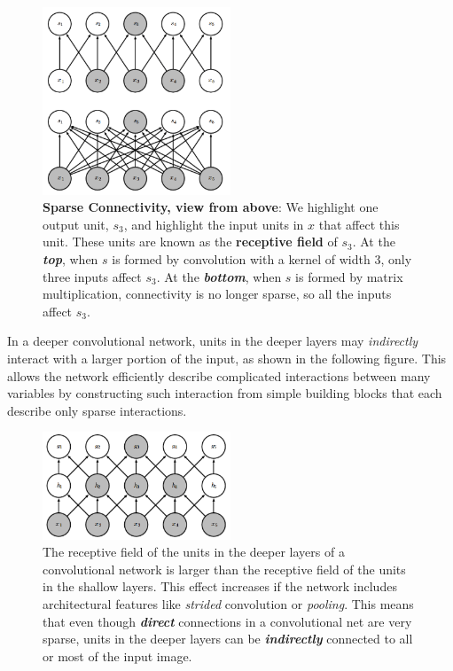 \documentclass{report}
\begin{document}
\begin{figure}[H]
  \centering
  \includegraphics[width=0.5\textwidth]{Convolutional_Networks/sparse_connectivity_2.png}
  \caption{\textbf{Sparse Connectivity, view from above}: We highlight one output unit, $s_3$, and highlight the input units in $x$ that affect this unit. These units are known as the \textbf{receptive field} of $s_3$. At the \textbf{\textit{top}}, when $s$ is formed by convolution with a kernel of width 3, only three inputs affect $s_3$. At the \textbf{\textit{bottom}}, when $s$ is formed by matrix multiplication, connectivity is no longer sparse, so all the inputs affect $s_3$.}
\end{figure}

In a deeper convolutional network, units in the deeper layers may \textit{indirectly} interact with a larger portion of the input, as shown in the following figure. This allows the network efficiently describe complicated interactions between many variables by constructing such interaction from simple building blocks that each describe only sparse interactions.

\begin{figure}[h!]
  \centering
  \includegraphics[width=0.5\textwidth]{Convolutional_Networks/sparse_connectivity_3.png}
  \caption{The receptive field of the units in the deeper layers of a convolutional network is larger than the receptive field of the units in the shallow layers. This effect increases if the network includes architectural features like \textit{strided} convolution or \textit{pooling}. This means that even though \textbf{\textit{direct}} connections in a convolutional net are very sparse, units in the deeper layers can be \textbf{\textit{indirectly}} connected to all or most of the input image.}
\end{figure}
\end{document}
